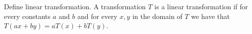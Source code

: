 {Define linear transformation.
}
{A transformation $T$ is a linear transformation if for every constants $a$ and $b$ and for every $x,y$ in the domain of $T$ we have that $T(ax+by) = aT(x)+bT(y)$.  
}